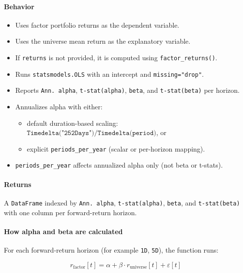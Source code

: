 \documentclass[11pt]{article}
\begin{document}
\paragraph{Behavior}
\begin{itemize}
  \item Uses factor portfolio returns as the dependent variable.
  \item Uses the universe mean return as the explanatory variable.
  \item If \texttt{returns} is not provided, it is computed using \texttt{factor\_returns()}.
  \item Runs \texttt{statsmodels.OLS} with an intercept and \texttt{missing="drop"}.
  \item Reports \texttt{Ann. alpha}, \texttt{t-stat(alpha)}, \texttt{beta}, and \texttt{t-stat(beta)} per horizon.
  \item Annualizes alpha with either:
  \begin{itemize}
    \item default duration-based scaling: \(\texttt{Timedelta("252Days")} / \texttt{Timedelta(period)}\), or
    \item explicit \texttt{periods\_per\_year} (scalar or per-horizon mapping).
  \end{itemize}
  \item \texttt{periods\_per\_year} affects annualized alpha only (not beta or t-stats).
\end{itemize}

\paragraph{Returns}
A \texttt{DataFrame} indexed by \texttt{Ann. alpha}, \texttt{t-stat(alpha)}, \texttt{beta}, and \texttt{t-stat(beta)} with one column per forward-return horizon.

\paragraph{How alpha and beta are calculated}
For each forward-return horizon (for example \texttt{1D}, \texttt{5D}), the function runs:

\[
r_{\text{factor}}[t] = \alpha + \beta \cdot r_{\text{universe}}[t] + \varepsilon[t]
\]
\end{document}
